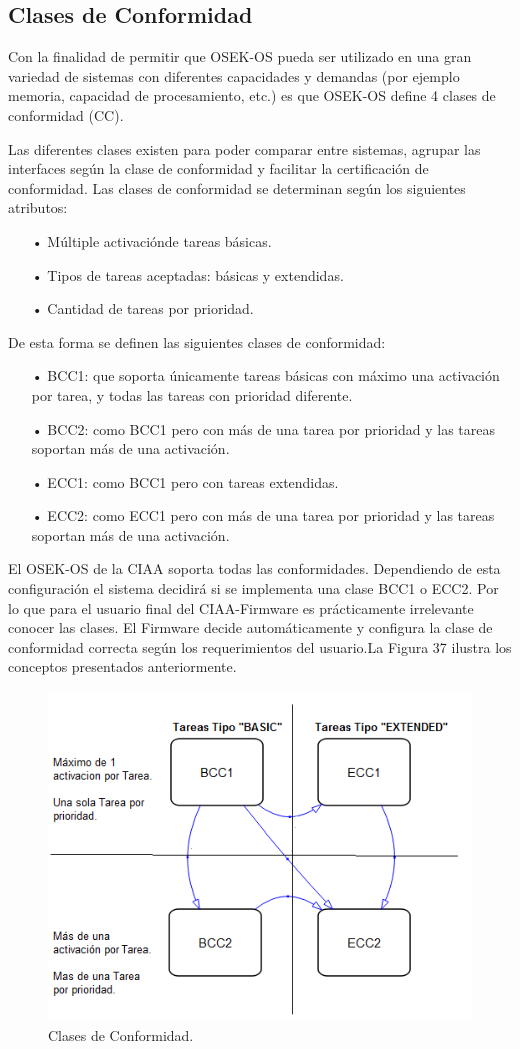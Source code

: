 \documentclass[12pt,letterpaper]{article}
\begin{document}
\subsection{Clases de Conformidad}
Con la finalidad de permitir que OSEK-OS pueda ser utilizado en una gran variedad de sistemas con diferentes capacidades y demandas (por ejemplo memoria, capacidad de procesamiento, etc.) es que OSEK-OS define 4 clases de conformidad (CC).

Las diferentes clases existen para poder comparar entre sistemas, agrupar las interfaces según la clase de conformidad y facilitar la certificación de conformidad. Las clases de conformidad se determinan según los siguientes atributos: 

\begin{enumerate}
\item[•]Múltiple activaciónde tareas básicas.
\item[•]Tipos de tareas aceptadas: básicas y extendidas.
\item[•]Cantidad de tareas por prioridad.
\end{enumerate}

De esta forma se definen las siguientes clases de conformidad:
\begin{enumerate}
\item[•]BCC1: que soporta únicamente tareas  básicas con máximo una activación por tarea, y todas las tareas con prioridad diferente.
\item[•]BCC2: como  BCC1 pero con más de una tarea por prioridad y las tareas soportan más de una activación.
\item[•]ECC1: como BCC1 pero con tareas extendidas.
\item[•]ECC2: como  ECC1 pero con más de una tarea por prioridad y las tareas soportan más de una activación.
\end{enumerate}
El OSEK-OS de la CIAA soporta todas las conformidades. Dependiendo de esta configuración el sistema decidirá si se implementa una clase BCC1 o ECC2. Por lo que para el usuario final del CIAA-Firmware es prácticamente irrelevante conocer las clases. El Firmware decide automáticamente y configura la clase de conformidad correcta según los requerimientos del usuario.La Figura 37 ilustra los conceptos presentados anteriormente.


\begin{figure}[!h]
\centering
\includegraphics[width=8 cm]{figuras/f17.png}
\caption{Clases de Conformidad.}
\label{Fig34}
\end{figure}
\end{document}

